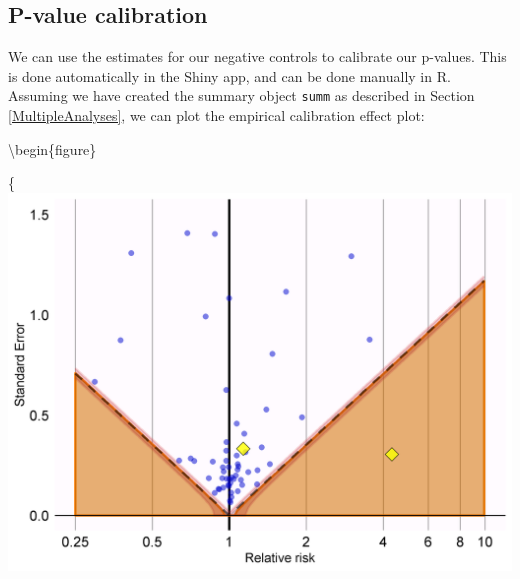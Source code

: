 \documentclass[11pt]{book}
\newenvironment{Shaded}{\begin{snugshade}}{\end{snugshade}}
\newcommand{\KeywordTok}[1]{\textcolor[rgb]{0.13,0.29,0.53}{\textbf{#1}}}
\newcommand{\DataTypeTok}[1]{\textcolor[rgb]{0.13,0.29,0.53}{#1}}
\newcommand{\StringTok}[1]{\textcolor[rgb]{0.31,0.60,0.02}{#1}}
\newcommand{\CommentTok}[1]{\textcolor[rgb]{0.56,0.35,0.01}{\textit{#1}}}
\newcommand{\OtherTok}[1]{\textcolor[rgb]{0.56,0.35,0.01}{#1}}
\newcommand{\OperatorTok}[1]{\textcolor[rgb]{0.81,0.36,0.00}{\textbf{#1}}}
\newcommand{\NormalTok}[1]{#1}
\begin{document}
\subsection{P-value calibration}\label{p-value-calibration-1}

We can use the estimates for our negative controls to calibrate our
p-values. This is done automatically in the Shiny app, and can be done
manually in R. Assuming we have created the summary object \texttt{summ}
as described in Section \ref{MultipleAnalyses}, we can plot the
empirical calibration effect plot:

\begin{Shaded}
\end{Shaded}

\textbackslash{}begin\{figure\}

\{\centering \includegraphics[width=0.7\linewidth]{images/MethodValidity/pValueCal}
\end{document}
